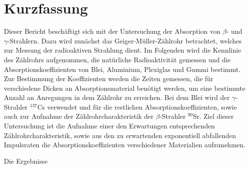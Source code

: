 \section{Kurzfassung}

Dieser Bericht beschäftigt sich mit der Untersuchung der Absorption von $\beta$- und $\gamma$-Strahlern.
Dazu wird zunächst das Geiger-Müller-Zählrohr betrachtet, welches zur Messung der radioaktiven Strahlung dient.
Im Folgenden wird die Kennlinie des Zählrohrs aufgenommen, die natürliche Radioaktivität gemessen und die Absorptionskoeffizienten von Blei, Aluminium, Plexiglas und Gummi bestimmt.
Zur Bestimmung der Koeffizienten werden die Zeiten gemessen, die für verschiedene Dicken an Absorptionsmaterial benötigt werden, um eine bestimmte Anzahl an Anregungen in dem Zählrohr zu erreichen.
Bei dem Blei wird der $\gamma$-Strahler $^{137}$Cs verwendet und für die restlichen Absorptionskoeffizienten, sowie auch zur Aufnahme der Zählrohrcharakteristik der $\beta$-Strahler $^{90}$Sr.
Ziel dieser Untersuchung ist die Aufnahme einer den Erwartungen entsprechenden Zählrohrcharakteristik, sowie aus den zu erwartenden exponentiell abfallenden Impulsraten die Absorptionskoeffizienten verschiedener Materialien aufzunehmen.

Die Ergebnisse %
